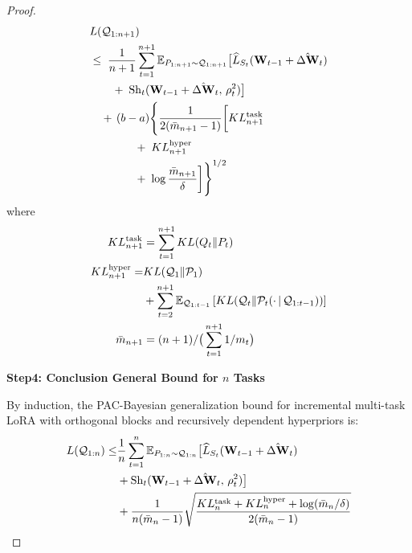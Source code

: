 \documentclass[letterpaper]{article} %
\begin{document}
\begin{proof}
\begin{align}
& L(\mathcal{Q}_{1:n+1})  \\
&\leq\; \frac{1}{n+1} \sum_{t=1}^{n+1}
    \mathbb{E}_{P_{1:n+1} \sim \mathcal{Q}_{1:n+1}}\big[
        \widehat{L}_{S_t}(\mathbf{W}_{t-1} + \hat{\Delta\mathbf{W}}_t) \notag \\
&\qquad
    +\; \mathrm{Sh}_t(\mathbf{W}_{t-1} + \hat{\Delta\mathbf{W}}_t,\, \rho_t^2)
    \big] \notag \\
&\quad
    +\, (b-a) \Bigg\{
        \frac{1}{2(\bar{m}_{n+1} - 1)} \bigg[
            KL_{n+1}^{\text{task}} \notag \\
&\qquad\qquad
            +\; KL_{n+1}^{\text{hyper}} \notag \\
&\qquad\qquad
            +\; \log\frac{\bar{m}_{n+1}}{\delta}
        \bigg]
    \Bigg\}^{1/2}
\end{align}
where
    \begin{equation}
        \begin{aligned}
        KL_{n+1}^{\text{task}} &= \sum_{t=1}^{n+1} KL(Q_t\|P_t)\\
        KL_{n+1}^{\text{hyper}} = & KL(\mathcal{Q}_1\|\mathcal{P}_1)  \\
        &+\sum_{t=2}^{n+1} \mathbb{E}_{\mathcal{Q}_{1:t-1}}
        \left[ KL(\mathcal{Q}_t \| \mathcal{P}_t(\cdot\,|\,\mathcal{Q}_{1:t-1})) \right] \\
        \bar{m}_{n+1} &= (n+1)/\big(\sum_{t=1}^{n+1} 1/m_t\big) \notag
    \end{aligned}
    \end{equation}

\textbf{Step4: Conclusion General Bound for $n$ Tasks}

By induction, the PAC-Bayesian generalization bound for incremental multi-task LoRA with orthogonal blocks and recursively dependent hyperpriors is:
\begin{align}
        L(\mathcal{Q}_{1:n}) \leq & \frac{1}{n} \sum_{t=1}^{n}
        \mathbb{E}_{P_{1:n} \sim \mathcal{Q}_{1:n}}\big[
            \widehat{L}_{S_t}(\mathbf{W}_{t-1} + \hat{\Delta\mathbf{W}}_t) \notag\\
        & + \mathrm{Sh}_t(\mathbf{W}_{t-1} + \hat{\Delta\mathbf{W}}_t,\, \rho_t^2)
        \big] \notag\\
        & + \frac{1 }{n(\bar{m}_n - 1)}\sqrt{
            \frac{KL_{n}^{\text{task}} + KL_{n}^{\text{hyper}} +\log(\bar{m}_{n}/\delta)}{2(\bar{m}_{n} - 1)}
        }
    \end{align}


\end{proof}
\end{document}
